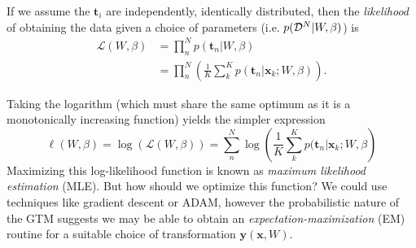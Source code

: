 If we assume the $\mathbf{t}_i$ are independently, identically distributed, then the \textit{likelihood} of obtaining the data given a choice of parameters (i.e. $p(\mathcal{D}^N\vert W,\beta)$) is
\begin{equation}
  \begin{aligned}
  \mathcal{L}(W,\beta) &= \prod\limits_{n}^N p(\mathbf{t}_n \vert W,\beta) \\
  &= \prod\limits_n^N \left(\frac{1}{K}\sum_k^K p(\mathbf{t}_n \vert \mathbf{x}_k; W, \beta) \right).
  \end{aligned}
\end{equation}

Taking the logarithm (which must share the same optimum as it is a monotonically increasing function) yields the simpler expression
\begin{equation}
  \ell(W,\beta) = \log(\mathcal{L}(W,\beta)) = \sum_n^N\log\left(\frac{1}{K}\sum_k^K p(\mathbf{t}_n \vert \mathbf{x}_k; W, \beta \right)
\end{equation}
Maximizing this log-likelihood function is known as \textit{maximum likelihood estimation} (MLE). But how should we optimize this function? We could use techniques like gradient descent or ADAM, however the probabilistic nature of the GTM suggests we may be able to obtain an \textit{expectation-maximization} (EM) routine for a suitable choice of transformation $\mathbf{y}(\mathbf{x},W)$.


